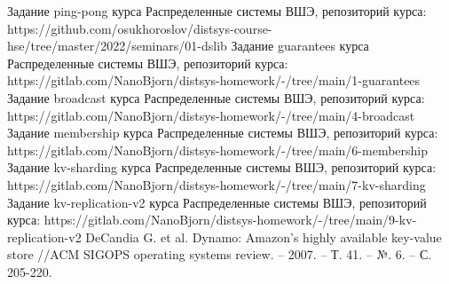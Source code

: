 \documentclass[a4paper,12pt]{extarticle}
\begin{document}
\begin{thebibliography}{00}
 Задание ping-pong курса Распределенные системы ВШЭ, репозиторий курса: https://github.com/osukhoroslov/distsys-course-hse/tree/master/2022/seminars/01-dslib
 Задание guarantees курса Распределенные системы ВШЭ, репозиторий курса: https://gitlab.com/NanoBjorn/distsys-homework/-/tree/main/1-guarantees
 Задание broadcast курса Распределенные системы ВШЭ, репозиторий курса: https://gitlab.com/NanoBjorn/distsys-homework/-/tree/main/4-broadcast
 Задание membership курса Распределенные системы ВШЭ, репозиторий курса:  https://gitlab.com/NanoBjorn/distsys-homework/-/tree/main/6-membership
 Задание kv-sharding курса Распределенные системы ВШЭ, репозиторий курса: https://gitlab.com/NanoBjorn/distsys-homework/-/tree/main/7-kv-sharding
 Задание kv-replication-v2 курса Распределенные системы ВШЭ, репозиторий курса: https://gitlab.com/NanoBjorn/distsys-homework/-/tree/main/9-kv-replication-v2
 DeCandia G. et al. Dynamo: Amazon's highly available key-value store //ACM SIGOPS operating systems review. – 2007. – Т. 41. – №. 6. – С. 205-220.

\end{thebibliography}
	
	
\end{document}
